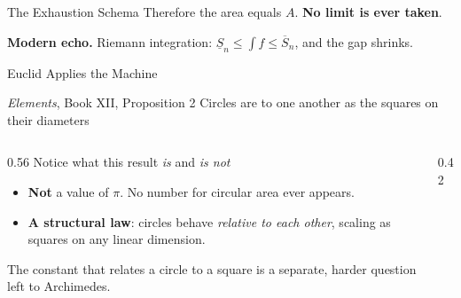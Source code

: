 \documentclass[aspectratio=169]{beamer}
\begin{document}
\begin{frame}{The Exhaustion Schema}
        Therefore the area equals $A$. \textbf{No limit is ever
                taken}.

        \textcolor{TealThr}{\textbf{Modern echo.}} Riemann
        integration: $\underline{S}_n \le \int f \le \overline{S}_n$,
        and the gap shrinks.
\end{frame}


\begin{frame}{Euclid Applies the Machine}
        \begin{block}{\emph{Elements}, Book XII, Proposition 2}
                Circles are to one another as the squares on their
                diameters
        \end{block}

        \vspace{1.4em}
        \begin{columns}
                \begin{column}{0.56\textwidth}
                        Notice what this result \emph{is} and \emph{is not}
                        \begin{itemize}
                                \item \textbf{Not} a value of $\pi$.
                                        No number for circular area
                                        ever appears.
                                \item \textbf{A structural law}:
                                        circles behave \emph{relative
                                        to each other}, scaling as
                                        squares on any linear
                                        dimension.
                        \end{itemize}

                        \vspace{0.1cm}
                        The constant that relates a circle to a square
                        is a separate, harder question left to
                        Archimedes.
                \end{column}

                \begin{column}{0.42\textwidth}
                        \centering
\end{column}
\end{columns}
\end{frame}
\end{document}
